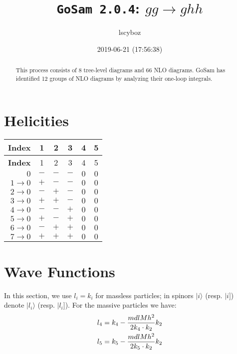 \documentclass[a4paper]{article}
\title{\texttt{GoSam 2.0.4}: ${g}{g}\rightarrow{g}{h}{h}$}
\author{lscyboz}
\date{2019-06-21 (17:56:38)}
\newcommand{\kea}[1]{\vert #1 \rangle}
\newcommand{\keb}[1]{\vert #1 ]}
\begin{document}
\maketitle
\begin{abstract}
\noindent This process consists of 8 tree-level diagrams and 66 NLO diagrams. GoSam has identified 12 groups  of NLO diagrams by analyzing their one-loop integrals.
\end{abstract}
\newpage
\tableofcontents
\newpage

\section{Helicities}

\begin{longtable}[c]{r|ccccc}
\bf{Index} &1&2&3&4&5\\
\hline
\endfirsthead
\bf{Index} &1&2&3&4&5\\
\hline
\endhead 
$0$& $-$& $-$& $-$& $0$& $0$\\
$1\rightarrow 0$& $+$& $-$& $-$& $0$& $0$\\
$2\rightarrow 0$& $-$& $+$& $-$& $0$& $0$\\
$3\rightarrow 0$& $+$& $+$& $-$& $0$& $0$\\
$4\rightarrow 0$& $-$& $-$& $+$& $0$& $0$\\
$5\rightarrow 0$& $+$& $-$& $+$& $0$& $0$\\
$6\rightarrow 0$& $-$& $+$& $+$& $0$& $0$\\
$7\rightarrow 0$& $+$& $+$& $+$& $0$& $0$\\
\end{longtable}
\section{Wave Functions}
In this section, we use $l_i=k_i$ for massless particles;
in spinors $\kea{i}$ (resp. $\keb{i}$) denote $\kea{l_i}$ (resp. $\keb{l_i}$).
For the massive particles we have:
\begin{align}
l_{4} &= k_{4} - \frac{mdlMh^2}{%
      2 k_{4}\cdot k_{2}}k_{2}\\
l_{5} &= k_{5} - \frac{mdlMh^2}{%
      2 k_{5}\cdot k_{2}}k_{2}
\end{align}
\end{document}
